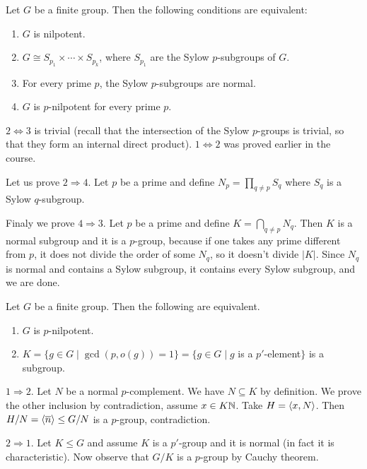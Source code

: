 \documentclass[twoside, 11pt]{article}
\begin{document}
\begin{teorema}
Let $G$ be a finite group. Then the following conditions are equivalent:
\begin{enumerate}
\item $G$ is nilpotent.
\item $G\cong S_{p_1}\times\cdots\times S_{p_k}$, where $S_{p_1}$ are the Sylow $p$-subgroups of $G$.
\item For every prime $p$, the Sylow $p$-subgroups are normal. 
\item $G$ is $p$-nilpotent for every prime $p$.
\end{enumerate}
\end{teorema}
\begin{dem}
$2\Leftrightarrow 3$ is trivial (recall that the intersection of the Sylow $p$-groups is trivial, so that they form an internal direct product). $1\Leftrightarrow 2$ was proved earlier in the course.

Let us prove $2\Rightarrow 4$. Let $p$ be a prime and define $N_p=\prod_{q\neq p} S_q$ where $S_q$ is a Sylow $q$-subgroup. 

Finaly we prove $4\Rightarrow 3$. Let $p$ be a prime and define $K=\bigcap_{q\neq p} N_q$. Then $K$ is a normal subgroup and it is a $p$-group, because if one takes any prime different from $p$, it does not divide the order of some $N_q$, so it doesn't divide $|K|$. Since $N_q$ is normal and contains a Sylow subgroup, it contains every Sylow subgroup, and we are done.
\end{dem}

\begin{prop}
Let $G$ be a finite group. Then the following are equivalent.
\begin{enumerate}
\item $G$ is $p$-nilpotent.
\item $K=\{g\in G\mid \gcd(p,o(g))=1\}=\{g\in G\mid g$ is a $p'$-element$\}$ is a subgroup.
\end{enumerate}
\end{prop}
\begin{dem}
$1\Rightarrow 2$. Let $N$ be a normal $p$-complement. We have $N\subseteq K$ by definition. We prove the other inclusion by contradiction, assume $x\in K\mathbb{N}$. Take $H=\langle{x,N}\rangle$. Then $H/N=\langle{\overline{n}}\rangle\leq G/N$ is a $p$-group, contradiction.

$2\Rightarrow 1$. Let $K\leq G$ and assume $K$ is a $p'$-group and it is normal (in fact it is characteristic). Now observe that $G/K$ is a $p$-group by Cauchy theorem.
\end{dem}
\end{document}
